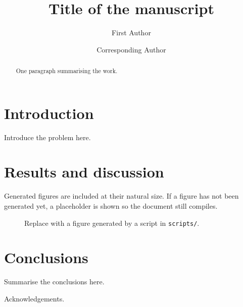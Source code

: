 \documentclass[journal=jacsat,manuscript=article]{achemso}
\title{Title of the manuscript}
\author{First Author}
\affiliation{Department, University, City, Country}
\author{Corresponding Author}
\affiliation{Department, University, City, Country}
\begin{document}
\begin{abstract}
  One paragraph summarising the work.
\end{abstract}

\section{Introduction}

Introduce the problem here.

\section{Results and discussion}

Generated figures are included at their natural size. If a figure has not been generated
yet, a placeholder is shown so the document still compiles.

\begin{figure}
  \centering
  \caption{Replace with a figure generated by a script in \texttt{scripts/}.}
  \label{fig:example}
\end{figure}

\section{Conclusions}

Summarise the conclusions here.

\begin{acknowledgement}
  Acknowledgements.
\end{acknowledgement}


\end{document}
